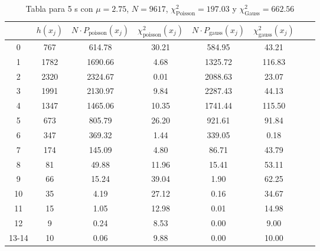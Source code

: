 \begin{center}
\begin{table}[H]
\caption{Tabla para 5 s con $\mu=2.75$, $N=9617$, $\chi^2_{\text{Poisson}}=197.03$  y $\chi^2_{\text{Gauss}}=662.56$}
\label{Tab:histo_m_5s}
\begin{tabular}{cccccccc}
\toprule
 & $h(x_j)$ & $N \cdot P_{\text{poisson}} (x_j)$ & $\chi^2_{\text{poisson}}(x_j)$ & $N \cdot P_{\text{gauss}} (x_j)$ & $\chi^2_{\text{gauss}}(x_j)$ \\
\midrule
0 & \num{  767} & \num{614.78} & \num{30.21} & \num{584.95} & \num{43.21} \\
1 & \num{ 1782} & \num{1690.66} & \num{4.68} & \num{1325.72} & \num{116.83} \\
2 & \num{ 2320} & \num{2324.67} & \num{0.01} & \num{2088.63} & \num{23.07} \\
3 & \num{ 1991} & \num{2130.97} & \num{9.84} & \num{2287.43} & \num{44.13} \\
4 & \num{ 1347} & \num{1465.06} & \num{10.35} & \num{1741.44} & \num{115.50} \\
5 & \num{  673} & \num{805.79} & \num{26.20} & \num{921.61} & \num{91.84} \\
6 & \num{  347} & \num{369.32} & \num{1.44} & \num{339.05} & \num{0.18} \\
7 & \num{  174} & \num{145.09} & \num{4.80} & \num{86.71} & \num{43.79} \\
8 & \num{   81} & \num{49.88} & \num{11.96} & \num{15.41} & \num{53.11} \\
9 & \num{   66} & \num{15.24} & \num{39.04} & \num{1.90} & \num{62.25} \\
10 & \num{   35} & \num{4.19} & \num{27.12} & \num{0.16} & \num{34.67} \\
11 & \num{   15} & \num{1.05} & \num{12.98} & \num{0.01} & \num{14.98} \\
12 & \num{    9} & \num{0.24} & \num{8.53} & \num{0.00} & \num{9.00} \\
13-14 & \num{   10} & \num{0.06} & \num{9.88} & \num{0.00} & \num{10.00} \\
\bottomrule
\end{tabular}
\end{table}
\end{center}
